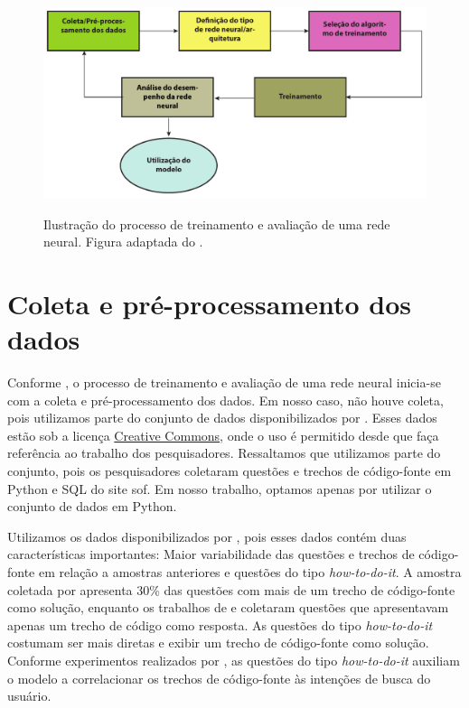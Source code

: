 \begin{figure}[H]
\centering
\caption{Ilustração do processo de treinamento e avaliação de uma rede neural. Figura adaptada do .}
\includegraphics[width=1\textwidth]{figuras/cap-experimento/neural_network_training_lifecycle_dissertation.pdf}
\label{fig:training-neural-network-cyclic}
\end{figure}

\section{Coleta e pré-processamento dos dados}
\label{sec:coleta-pre-processamento-dos-dados}

Conforme , o processo de treinamento e avaliação de uma rede neural inicia-se com a coleta e pré-processamento dos dados. Em nosso caso, não houve coleta, pois utilizamos parte do conjunto de dados disponibilizados por . Esses dados estão sob a licença \href{https://creativecommons.org/licenses/by/4.0/}{Creative Commons}, onde o uso é permitido desde que faça referência ao trabalho dos pesquisadores. Ressaltamos que utilizamos parte do conjunto, pois os pesquisadores coletaram questões e trechos de código-fonte em Python e SQL do site \Gls{sof}. Em nosso trabalho, optamos apenas por utilizar o conjunto de dados em Python. 


Utilizamos os dados disponibilizados por , pois esses dados contém duas características importantes: Maior variabilidade das questões e trechos de código-fonte em relação a amostras anteriores \cite{iyer-etal-2016-summarizing, Allamanis-bimodal-source-code-natural-language:2015} e questões do tipo \textit{how-to-do-it}. A amostra coletada por  apresenta 30\% das questões com mais de um trecho de código-fonte como solução, enquanto os trabalhos de  e  coletaram questões que apresentavam apenas um trecho de código como resposta. As questões do tipo \textit{how-to-do-it} costumam ser mais diretas e exibir um trecho de código-fonte como solução. Conforme experimentos realizados por , as questões do tipo \textit{how-to-do-it} auxiliam o modelo a correlacionar os trechos de código-fonte às intenções de busca do usuário.


